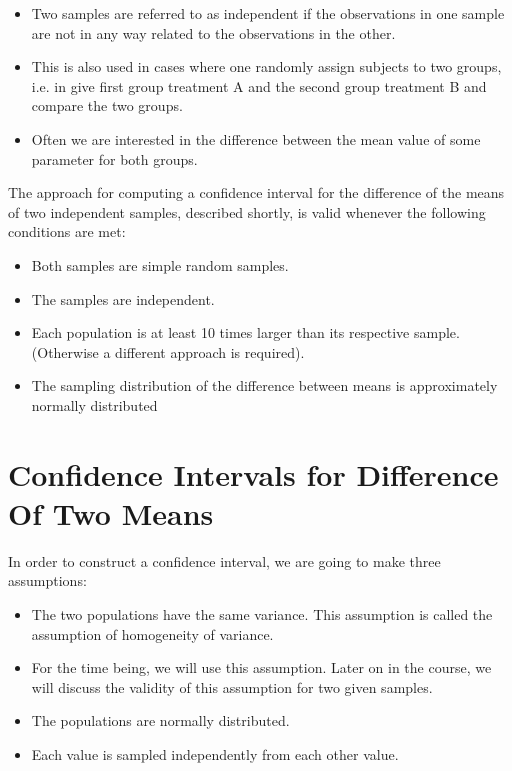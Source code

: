 \documentclass[]{report}
\begin{document}
\begin{itemize}
\item Two samples are referred to as independent if the observations in one sample are not in any way related to the observations in the other. \item This is also used in cases where one randomly assign subjects to two groups, i.e. in give first group treatment A and the second group treatment B and compare the two groups.
\item Often we are interested in the difference between the mean value of some parameter for both groups.
\end{itemize}





The approach for computing a confidence interval for the difference of the means of two independent samples,  described shortly, is valid whenever the following conditions are met:

\begin{itemize}
\item Both samples are simple random samples.
\item The samples are independent.
\item Each population is at least 10 times larger than its respective sample. (Otherwise a different approach is required).
\item The sampling distribution of the difference between means is approximately normally distributed
\end{itemize}

\section{Confidence Intervals for Difference Of Two Means}
In order to construct a confidence interval, we are going to make three assumptions:

\begin{itemize}
\item The two populations have the same variance. This assumption is called the assumption of homogeneity of variance.
\item For the time being, we will use this assumption. Later on in the course, we will discuss the validity of this assumption for two given samples.
\item The populations are normally distributed.
\item Each value is sampled independently from each other value.
\end{itemize}
\end{document}
